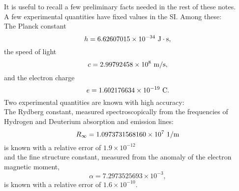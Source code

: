 \documentclass[12pt,a4paper,twoside]{report}
\def\hplanck{6.62607015\times 10^{-34}}
\def\cspeed{2.99792458\times 10^{8}}
\def\e{1.602176634\times 10^{-19}}
\def\rydberg{1.0973731568160\times 10^{7}}
\def\alphaf{7.2973525693\times 10^{-3}}
\begin{document}
It is useful to recall a few preliminary facts needed in the rest of 
these notes. \\
A few experimental quantities have fixed values in the SI. Among these:
\\
The Planck constant 
\begin{equation}
h=\hplanck\ {\rm J}\cdot {\rm s}, 
\label{hplanck}
\end{equation}
the speed of light 
\begin{equation}
c=\cspeed\ {\rm m}/{\rm s},
\label{cspeed}
\end{equation}
 and the electron charge
\begin{equation}
e=\e\ {\rm C}. 
\label{echarge}
\end{equation}
Two experimental quantities are known with high accuracy:
\\
The Rydberg constant, measured spectroscopically from the frequencies of
Hydrogen and Deuterium absorption and emission lines:
\begin{equation}
R_\infty=
\rydberg\ 1/{\rm m}
\label{rydberg}
\end{equation}
is known with a relative error of $1.9\times 10^{-12}$ \\
and the fine structure constant, measured from the anomaly of the
electron magnetic moment,
\begin{equation}
\alpha=
\alphaf,
\label{alpha}
\end{equation}
is known with a relative error of $1.6\times 10^{-10}$.
\end{document}

